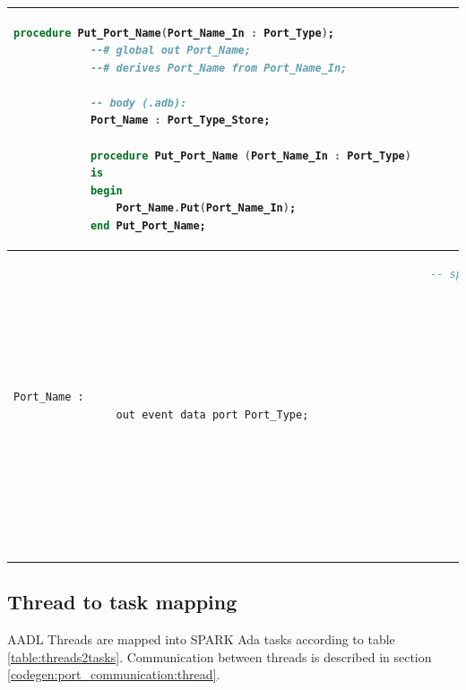 \begin{center}
\begin{longtable}{| p{2in} | p{4in} |}
\begin{lstlisting}[language=ada]
			procedure Put_Port_Name(Port_Name_In : Port_Type);
			--# global out Port_Name;
			--# derives Port_Name from Port_Name_In;

			-- body (.adb):
			Port_Name : Port_Type_Store;

			procedure Put_Port_Name (Port_Name_In : Port_Type) 
			is
			begin
				Port_Name.Put(Port_Name_In);
			end Put_Port_Name;
		\end{lstlisting} 

		\\ \hline

		\begin{lstlisting}[language=aadl]
			Port_Name : 
				out event data port Port_Type;
		\end{lstlisting} 
		&
		\begin{lstlisting}[language=ada]
			-- spec (.ads)
			--# own protected Port_Name : Port_Type_Store(Priority => 10);
			
			procedure Send_Port_Name;
    		--# global in Port_Name;

			-- body (.adb):
			Port_Name : Port_Type_Store;

			procedure Send_Port_Name 
			is
			begin
				-- TODO: implement receiving Port_Name value
				-- e.g.:
				-- Some_Pkg.Put_Port_Name(Port_Name);
			end Send_Port_Name;
		\end{lstlisting} 
	\end{longtable}
\end{center}
\doublespacing


\subsection{Thread to task mapping}
\label{codegen:mapping:threads}

AADL Threads are mapped into SPARK Ada tasks according to table \ref{table:threads2tasks}. Communication between threads is described in section \ref{codegen:port_communication:thread}.

